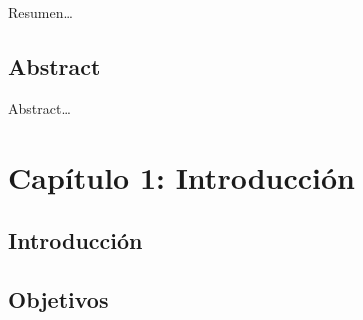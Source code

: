 \documentclass[12pt,a4paper,]{book}
\def\ifdoblecara{} %
\def\ifprincipal{} %
\numberwithin{dummy}{section}
\theoremstyle{ocrenumbox}
\theoremstyle{blacknumex}
\theoremstyle{blacknumbox}
\theoremstyle{ocrenum}
\theoremstyle{ocrenum}
\begin{document}
Resumen\ldots{}

\clearpage
\section*{Abstract}

Abstract\ldots{}

\cleardoublepage   
\listoffigures
{}

\cleardoublepage   
\listoftables


\cleardoublepage


\ifdefined\ifdoblecara
\fancyhead[LE,RO]{\scriptsize\rightmark}
\fancyfoot[LO,RE]{\scriptsize\slshape \leftmark}
\fancyfoot[C]{}
\fancyfoot[LE,RO]{\footnotesize\thepage}
\else
\fancyhead[RO]{\scriptsize\rightmark}
\fancyfoot[LO]{\scriptsize\slshape \leftmark}
\fancyfoot[C]{}
\fancyfoot[RO]{\footnotesize\thepage}
\fi

\renewcommand{\headrulewidth}{0.4pt}
\renewcommand{\footrulewidth}{0.4pt}

\ifdefined\ifprincipal
\else
\setlength{\parindent}{1em}
\pagestyle{fancy}
\setcounter{tocdepth}{4}
\tableofcontents

\fi

\ifdefined\ifdoblecara
\fancyhead{}{}
\fancyhead[LE,RO]{\scriptsize\rightmark}
\fancyfoot[LO,RE]{\scriptsize\slshape \leftmark}
\fancyfoot[C]{}
\fancyfoot[LE,RO]{\footnotesize\thepage}
\else
\fancyhead{}{}
\fancyhead[RO]{\scriptsize\rightmark}
\fancyfoot[LO]{\scriptsize\slshape \leftmark}
\fancyfoot[C]{}
\fancyfoot[RO]{\footnotesize\thepage}
\fi

\renewcommand{\headrulewidth}{0.4pt}
\renewcommand{\footrulewidth}{0.4pt}

\hypertarget{capuxedtulo-1-introducciuxf3n}{%
\chapter{Capítulo 1: Introducción}\label{capuxedtulo-1-introducciuxf3n}}

\hypertarget{introducciuxf3n}{%
\section{Introducción}\label{introducciuxf3n}}

\hypertarget{objetivos}{%
\section{Objetivos}\label{objetivos}}
\end{document}
